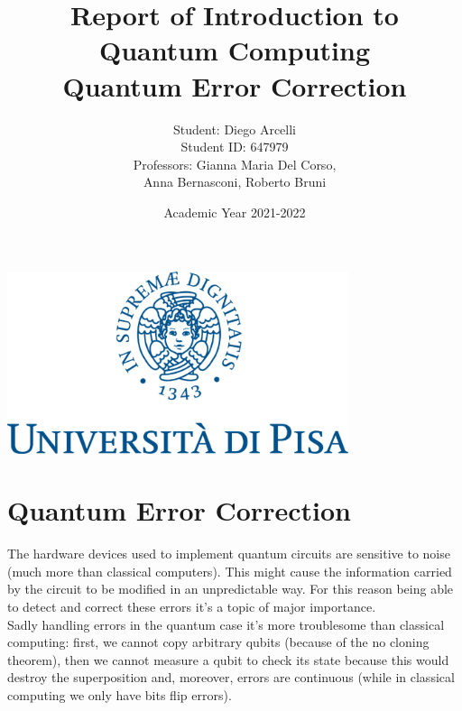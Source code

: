 \documentclass{article}
\begin{document}
	
	\begin{titlepage}
		
		\title{Report of Introduction to Quantum Computing \\ Quantum Error Correction}
		\author{Student: Diego Arcelli\\ Student ID: 647979 \\
			Professors: Gianna Maria Del Corso,\\Anna Bernasconi, Roberto Bruni}
		\date{Academic Year 2021-2022}
		\maketitle
		\centering
		\includegraphics[width=10cm]{./images/unipi_logo.png}
		
	\end{titlepage}
	\tableofcontents
	\newpage
	
	\section{Quantum Error Correction}
	 
	The hardware devices used to implement quantum circuits are sensitive to noise (much more than classical computers). This might cause the information carried by the circuit to be modified in an unpredictable way. For this reason being able to detect and correct these errors it's a topic of major importance. \\
	Sadly handling errors in the quantum case it's more troublesome than classical computing: first, we cannot copy arbitrary qubits (because of the no cloning theorem), then we cannot measure a qubit to check its state because this would destroy the superposition and, moreover, errors are continuous (while in classical computing we only have bits flip errors).
	
\end{document}

